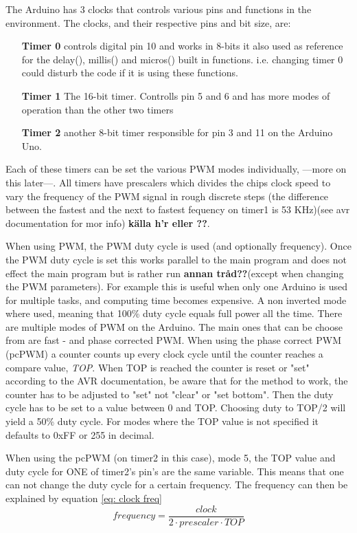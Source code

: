 \documentclass[a4paper,11pt]{kth-mag}
\begin{document}
The Arduino has 3 clocks that controls various pins and functions in the environment. The clocks, and their respective pins and bit size, are:
\begin{itemize}
\item[\textbf{Timer 0}]
controls digital pin 10 and
works in 8-bits it also used as reference for the delay(), millis() and micros() built in functions. i.e. changing timer 0 could disturb the code if it is using these functions. 
\item[\textbf{Timer 1}]
The 16-bit timer. Controlls pin 5 and 6 and has more modes of operation than the other two timers
\item[\textbf{Timer 2}]
another 8-bit timer responsible for pin 3 and 11 on the 
Arduino Uno.
\end{itemize}
Each of these timers can be set the various PWM modes individually, ---more on this later---. All timers have prescalers which divides the chips clock speed to vary the 
frequency of the PWM signal in rough discrete steps (the difference between the fastest and the next to fastest fequency on timer1 is 53 KHz)(see avr documentation for mor info) \textbf{källa h'r eller ??}. 

When using PWM, the PWM duty cycle is used (and optionally frequency). Once the PWM duty cycle is set this works parallel to the main program and does not effect the main program but is rather run \textbf{annan tråd??}(except 
when changing the PWM parameters). For example this is useful when only one Arduino is used for multiple tasks, and computing time becomes expensive. A non inverted mode where used, 
meaning that 100\% duty cycle equals full power all the time. There are multiple modes of PWM on the Arduino. The main ones that can be choose from are fast - and phase corrected PWM. 
When using the phase correct PWM (pcPWM) a counter counts up every clock cycle until the counter reaches a compare value, \textit{TOP}. When TOP is reached the counter is reset or "set" according to the AVR 
documentation, be aware that for the method to work, the counter has to be adjusted to "set" not "clear" or "set bottom". Then the duty cycle has to be set to a value between 0 and TOP. Choosing duty to TOP/2 will yield a 50\% duty cycle. For modes where the TOP value is not specified it defaults to 0xFF or 255 in decimal.

When using the pcPWM (on timer2 in this case), mode 5, the TOP value and duty cycle for ONE of timer2's pin's are the same variable. This means that one can not change the duty 
cycle for a certain frequency. The frequency can then be explained by equation \ref{eq: clock freq}
\begin{equation} \label{eq: clock freq}
frequency = \frac{clock}{2 \cdot prescaler \cdot TOP}
\end{equation}
\end{document}
